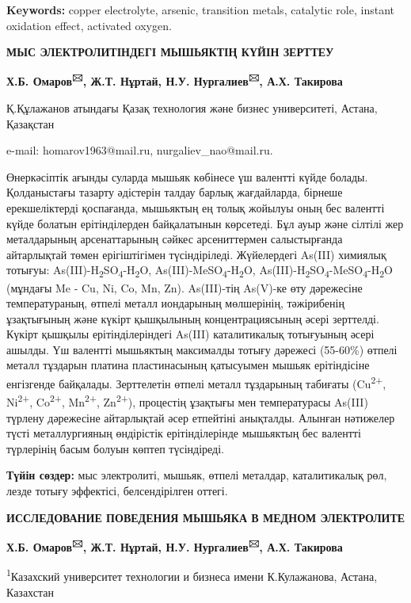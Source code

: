 {\bfseries Keywords:} copper electrolyte, arsenic, transition metals,
catalytic role, instant oxidation effect, activated oxygen.

{\bfseries МЫС ЭЛЕКТРОЛИТІНДЕГІ МЫШЬЯКТІҢ КҮЙІН ЗЕРТТЕУ}

{\bfseries Х.Б. Омаров\textsuperscript{🖂}, Ж.Т. Нұртай, Н.У.
Нургалиев\textsuperscript{🖂}, А.Х. Такирова}

Қ.Құлажанов атындағы Қазақ технология және бизнес университеті, Астана,
Қазақстан

e-mail: homarov1963@mail.ru, nurgaliev\_nao@mail.ru.

Өнеркәсіптік ағынды суларда мышьяк көбінесе үш валентті күйде болады.
Қолданыстағы тазарту әдістерін талдау барлық жағдайларда, бірнеше
ерекшеліктерді қоспағанда, мышьяктың ең толық жойылуы оның бес валентті
күйде болатын ерітінділерден байқалатынын көрсетеді. Бұл ауыр және
сілтілі жер металдарының арсенаттарының сәйкес арсениттермен
салыстырғанда айтарлықтай төмен ерігіштігімен түсіндіріледі. Жүйелердегі
As(III) химиялық тотығуы:
As(III)-H\textsubscript{2}SO\textsubscript{4}-H\textsubscript{2}O,
As(III)-MeSO\textsubscript{4}-H\textsubscript{2}O,
As(III)-H\textsubscript{2}SO\textsubscript{4}-MeSO\textsubscript{4}-H\textsubscript{2}O
(мұндағы Me - Cu, Ni, Co, Mn, Zn). As(III)-тің As(V)-ке өту дәрежесіне
температураның, өтпелі металл иондарының мөлшерінің, тәжірибенің
ұзақтығының және күкірт қышқылының концентрациясының әсері зерттелді.
Күкірт қышқылы ерітінділеріндегі As(III) каталитикалық тотығуының әсері
ашылды. Үш валентті мышьяктың максималды тотығу дәрежесі (55-60\%)
өтпелі металл тұздарын платина пластинасының қатысуымен мышьяк
ерітіндісіне енгізгенде байқалады. Зерттелетін өтпелі металл тұздарының
табиғаты (Cu\textsuperscript{2+}, Ni\textsuperscript{2+},
Co\textsuperscript{2+}, Mn\textsuperscript{2+}, Zn\textsuperscript{2+}),
процестің ұзақтығы мен температурасы As(III) түрлену дәрежесіне
айтарлықтай әсер етпейтіні анықталды. Алынған нәтижелер түсті
металлургияның өндірістік ерітінділерінде мышьяктың бес валентті
түрлерінің басым болуын көптеп түсіндіреді.

{\bfseries Түйін сөздер:} мыс электролиті, мышьяк, өтпелі металдар,
каталитикалық рөл, лезде тотығу эффектісі, белсендірілген оттегі.

{\bfseries ИССЛЕДОВАНИЕ ПОВЕДЕНИЯ МЫШЬЯКА В МЕДНОМ ЭЛЕКТРОЛИТЕ}

{\bfseries Х.Б. Омаров\textsuperscript{🖂}, Ж.Т. Нұртай, Н.У.
Нургалиев\textsuperscript{🖂}, А.Х. Такирова}

\textsuperscript{1}Казахский университет технологии и бизнеса имени
К.Кулажанова, Астана, Казахстан

